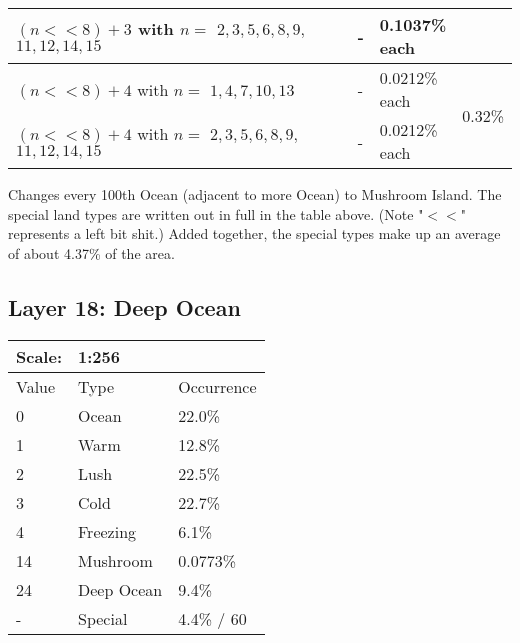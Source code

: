 \documentclass{article}
\begin{document}
\begin{tabular}{|l|l|l|l|}
		\makecell[l]{ $(n<<8)+3$ \\ with $n = $ \\ $2, 3, 5, 6, 8, 9,$ \\ $11, 12, 14, 15$ } & - &
		\makecell[l]{0.1037\% \\ each} & \\\hline\hline
				
		\makecell[l]{ $(n<<8)+4$ \\ with $n = $ \\ $1, 4, 7, 10, 13$ } & - & 
		\makecell[l]{0.0212\% \\ each} & \multirow{5}{*}{0.32\%}\\\cline{1-3}
		
		\makecell[l]{ $(n<<8)+4$ \\ with $n = $ \\ $2, 3, 5, 6, 8, 9,$ \\ $11, 12, 14, 15$ } & - &
		\makecell[l]{0.0212\% \\ each} & \\\hline

	\end{tabular}
	
	\medskip\noindent
	Changes every 100th Ocean (adjacent to more Ocean) to Mushroom Island. The special land types are written out in full in the table above. (Note "$<<$" represents a left bit shit.) Added together, the special types make up an average of about 4.37\% of the area.
	
	
	\subsection{Layer 18: Deep Ocean}
	\begin{tabular}{|l|l|l|}\hline
		Scale: & \multicolumn{2}{|l|}{1:256} \\\hline\hline
		Value  & Type       & Occurrence \\\hline
		0      & Ocean      & 22.0\%\\\hline
		1      & Warm       & 12.8\%\\\hline
		2      & Lush       & 22.5\%\\\hline
		3      & Cold       & 22.7\%\\\hline
		4      & Freezing   & 6.1\%\\\hline
		14     & Mushroom   & 0.0773\%\\\hline
		24     & Deep Ocean & 9.4\%\\\hline
		-      & Special    & 4.4\% / 60\\\hline
	\end{tabular}
	
\end{document}
